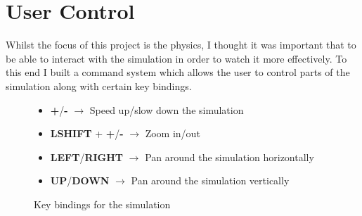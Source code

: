 \section{User Control}
	
	Whilst the focus of this project is the physics, I thought it was important that to be able to interact with the simulation in order to watch it more effectively. To this end I built a command system which allows the user to control parts of the simulation along with certain key bindings.
	
	\begin{figure}[h]
		\begin{itemize}
			\item \textbf{+}/\textbf{-} $\rightarrow$ Speed up/slow down the simulation
			\item \textbf{LSHIFT} + \textbf{+}/\textbf{-} $\rightarrow$ Zoom in/out
			\item \textbf{LEFT}/\textbf{RIGHT} $\rightarrow$ Pan around the simulation horizontally
			\item \textbf{UP}/\textbf{DOWN} $\rightarrow$ Pan around the simulation vertically
		\end{itemize}
		\caption{Key bindings for the simulation}
		\label{fig:keybindings}
	\end{figure}
	
